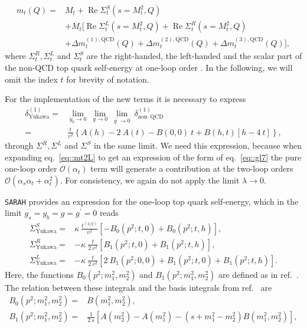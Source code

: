 \documentclass[a4paper,12pt]{book}
\begin{document}
\begin{align}
\nonumber
  m_t(Q) ={}& M_t + \operatorname{Re}\Sigma_{t}^S(s=M_t^2,Q) \\
  \nonumber
  &+ M_t \Big[ \operatorname{Re}\Sigma_{t}^L(s=M_t^2,Q) +
    \operatorname{Re}\Sigma_{t}^R(s=M_t^2,Q) \\
    \label{eq::gl7}
  &+ \Delta m_t^{(1),\text{QCD}}(Q) + \Delta m_t^{(2),\text{QCD}}(Q) + \Delta m_t^{(3),\text{QCD}}(Q) \Big],
\end{align}
where $\Sigma_t^R, \Sigma_t^L$ and $\Sigma_t^S$ are the right-handed, the left-handed and the scalar part of the non-QCD top quark self-energy at one-loop order \cite{FS2}. In the following, we will omit the index $t$ for brevity of notation.\par
For the implementation of the new terms it is necessary to express
\begin{align}
\nonumber
\delta^{(1)}_\text{Yukawa} ={}& \lim_{y_b\rightarrow 0}\> \lim_{g\rightarrow 0}\>\lim_{g^\prime\rightarrow 0}\> \delta^{(1)}_\text{non--QCD}\\
={}& \frac{t}{v^2}\left\lbrace A(h)-2\> A(t)- B(0,0)\>t+B(h,t)\left[h-4\>t\right]\right\rbrace,
\end{align}
through $\Sigma^R, \Sigma^L$ and $\Sigma^S$ in the same limit. We need this expression, because when expanding eq.\ \eqref{eq::mt2L} to get an expression of the form of eq.\ \eqref{eq::gl7} the pure one-loop order $\mathcal{O}(\alpha_t)$ term will generate a contribution at the two-loop orders $\mathcal{O}(\alpha_s\alpha_t + \alpha_t^2)$. For consistency, we again do not apply the limit $\lambda \rightarrow 0$.\par 
\texttt{SARAH} provides an expression for the one-loop top quark self-energy, which in the limit $g_s = y_b = g = g^\prime = 0$ reads
\begin{align}
\Sigma^S_\text{Yukawa}={}& \kappa\> \frac{t^{(3/2)}}{v^2} \left[-B_0(p^2; t, 0) + B_0(p^2; t, h)\right],\\
\Sigma^R_\text{Yukawa}={}& -\kappa \>\frac{t}{2\>v^2} \left[B_1(p^2;t,0)+B_1(p^2;t,h)\right],\\
\Sigma^L_\text{Yukawa}={}& -\kappa \>\frac{t}{2\>v^2} \left[2\>B_1(p^2;0,0)+B_1(p^2;t,0)+B_1(p^2;t,h)\right].
\end{align}
Here, the functions $B_0(p^2;m_1^2,m_2^2)$ and $B_1(p^2;m_1^2,m_2^2)$ are defined as in ref.\ \cite{steinhauser}. The relation between these integrals and the basis integrals from ref.\ \cite{martinmain} are
\begin{align}
B_0(p^2;m_1^2,m_2^2) ={}& B(m_1^2,m_2^2),\\
B_1(p^2;m_1^2,m_2^2) ={}& \frac{1}{2 \> s} \left[A(m_2^2)-A(m_1^2)-(s+m_1^2-m_2^2)B(m_1^2,m_2^2) \right],
\end{align}
\end{document}

